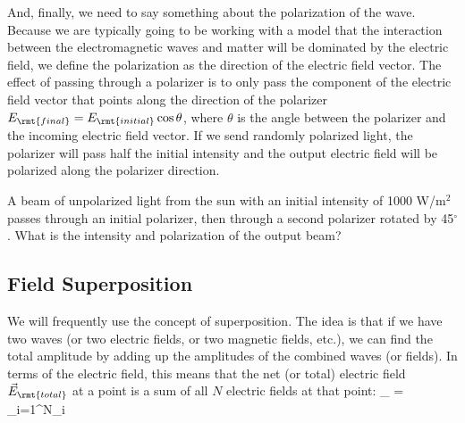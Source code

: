 \begin{marginfigure}
\centering
{}
\end{marginfigure}
And, finally, we need to say something about the polarization of the wave. Because we are typically going to be working with a model that the interaction between the electromagnetic waves and matter will be dominated by the electric field, we define the polarization as the direction of the electric field vector. The effect of passing through a polarizer is to only pass the component of the electric field vector that points along the direction of the polarizer \ie $E_\rmt{final} = E_\rmt{initial} \cos\theta$, where $\theta$ is the angle between the polarizer and the incoming electric field vector. If we send randomly polarized light, the polarizer will pass half the initial intensity  and the output electric field will be polarized along the polarizer direction.

\begin{exercise}
A beam of unpolarized light from the sun with an initial intensity of 1000 W/m$^2$ passes through an initial polarizer, then through a second polarizer rotated by 45$^\circ$. What is the intensity and polarization of the output beam?
\end{exercise}


\subsection{Field Superposition}
We will frequently use the concept of superposition. The idea is that if we have two waves (or two electric fields, or two magnetic fields, etc.), we can find the total amplitude by adding up the amplitudes of the combined waves (or fields). In terms of the electric field, this means that the net (or total) electric field $\vec{E}_\rmt{total}$ at a point is a sum of all $N$ electric fields at that point:
\beq
{}_ = \sum_{i=1}^{N}_i
\eeq

